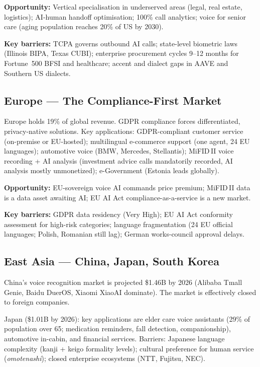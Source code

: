 \documentclass[12pt,a4paper]{article}
\begin{document}
\textbf{Opportunity:} Vertical specialisation in underserved areas (legal,
real estate, logistics); AI-human handoff optimisation; 100\% call
analytics; voice for senior care (aging population reaches 20\% of US by 2030).

\textbf{Key barriers:} TCPA governs outbound AI calls; state-level biometric
laws (Illinois BIPA, Texas CUBI); enterprise procurement cycles 9--12 months
for Fortune~500 BFSI and healthcare; accent and dialect gaps in AAVE and
Southern US dialects.

\subsection{Europe --- The Compliance-First Market}

Europe holds 19\% of global revenue.  GDPR compliance forces differentiated,
privacy-native solutions.  Key applications: GDPR-compliant customer service
(on-premise or EU-hosted); multilingual e-commerce support (one agent, 24 EU
languages); automotive voice (BMW, Mercedes, Stellantis); MiFID\,II voice
recording + AI analysis (investment advice calls mandatorily recorded, AI
analysis mostly unmonetized); e-Government (Estonia leads globally).

\textbf{Opportunity:} EU-sovereign voice AI commands price premium; MiFID\,II
data is a data asset awaiting AI; EU AI Act compliance-as-a-service is a new
market.

\textbf{Key barriers:} GDPR data residency (Very High); EU AI Act conformity
assessment for high-risk categories; language fragmentation (24 EU official
languages; Polish, Romanian still lag); German works-council approval delays.

\subsection{East Asia --- China, Japan, South Korea}

China's voice recognition market is projected \$1.46B by 2026 (Alibaba
Tmall Genie, Baidu DuerOS, Xiaomi XiaoAI dominate).  The market is
effectively closed to foreign companies.

Japan (\$1.01B by 2026): key applications are elder care voice assistants
(29\% of population over 65; medication reminders, fall detection,
companionship), automotive in-cabin, and financial services.  Barriers:
Japanese language complexity (kanji + keigo formality levels); cultural
preference for human service (\textit{omotenashi}); closed enterprise
ecosystems (NTT, Fujitsu, NEC).
\end{document}
